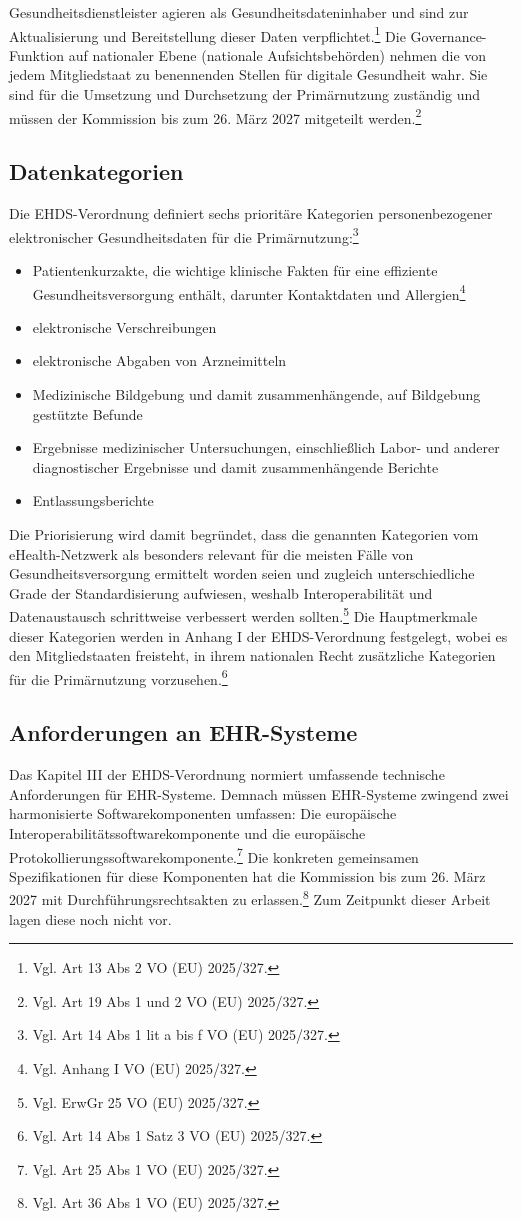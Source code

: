 Gesundheitsdienstleister agieren als Gesundheitsdateninhaber und sind zur Aktualisierung und Bereitstellung dieser Daten verpflichtet.\footnote{Vgl. Art 13 Abs 2 VO (EU) 2025/327.} Die Governance-Funktion auf nationaler Ebene (nationale Aufsichtsbehörden) nehmen die von jedem Mitgliedstaat zu benennenden Stellen für digitale Gesundheit wahr. Sie sind für die Umsetzung und Durchsetzung der Primärnutzung zuständig und müssen der Kommission bis zum 26. März 2027 mitgeteilt werden.\footnote{Vgl. Art 19 Abs 1 und 2 VO (EU) 2025/327.}

    \subsection{Datenkategorien}
Die EHDS-Verordnung definiert sechs prioritäre Kategorien personenbezogener elektronischer Gesundheitsdaten für die Primärnutzung:\footnote{Vgl. Art 14 Abs 1 lit a bis f VO (EU) 2025/327.}
\begin{itemize}
    \item Patientenkurzakte, die wichtige klinische Fakten für eine effiziente Gesundheitsversorgung enthält, darunter Kontaktdaten und Allergien\footnote{Vgl. Anhang I VO (EU) 2025/327.}
    \item elektronische Verschreibungen
    \item elektronische Abgaben von Arzneimitteln
    \item Medizinische Bildgebung und damit zusammenhängende, auf Bildgebung gestützte Befunde
    \item Ergebnisse medizinischer Untersuchungen, einschließlich Labor- und anderer diagnostischer Ergebnisse und damit zusammenhängende Berichte
    \item Entlassungsberichte
\end{itemize}
Die Priorisierung wird damit begründet, dass die genannten Kategorien vom eHealth-Netzwerk als besonders relevant für die meisten Fälle von Gesundheitsversorgung ermittelt worden seien und zugleich unterschiedliche Grade der Standardisierung aufwiesen, weshalb Interoperabilität und Datenaustausch schrittweise verbessert werden sollten.\footnote{Vgl. ErwGr 25 VO (EU) 2025/327.} Die Hauptmerkmale dieser Kategorien werden in Anhang I der EHDS-Verordnung festgelegt, wobei es den Mitgliedstaaten freisteht, in ihrem nationalen Recht zusätzliche Kategorien für die Primärnutzung vorzusehen.\footnote{Vgl. Art 14 Abs 1 Satz 3 VO (EU) 2025/327.}

    \subsection{Anforderungen an EHR-Systeme}
Das Kapitel III der EHDS-Verordnung normiert umfassende technische Anforderungen für EHR-Systeme. Demnach müssen EHR-Systeme zwingend zwei harmonisierte Softwarekomponenten umfassen: Die europäische Interoperabilitätssoftwarekomponente und die europäische Protokollierungssoftwarekomponente.\footnote{Vgl. Art 25 Abs 1 VO (EU) 2025/327.}
Die konkreten gemeinsamen Spezifikationen für diese Komponenten hat die Kommission bis zum 26. März 2027 mit Durchführungsrechtsakten zu erlassen.\footnote{Vgl. Art 36 Abs 1 VO (EU) 2025/327.} Zum Zeitpunkt dieser Arbeit lagen diese noch nicht vor.

